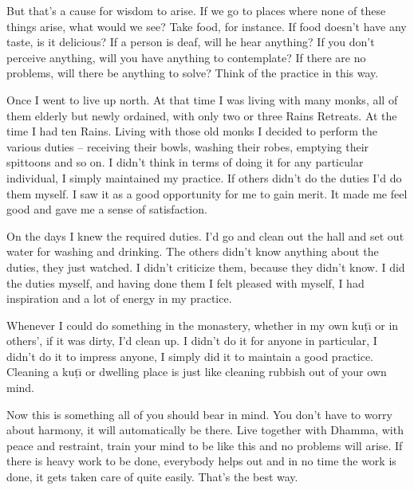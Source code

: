 But that's a cause for wisdom to arise. If we go to places where none of these things arise, what would we see? Take food, for instance. If food doesn't have any taste, is it delicious? If a person is deaf, will he hear anything? If you don't perceive anything, will you have anything to contemplate? If there are no problems, will there be anything to solve? Think of the practice in this way.

Once I went to live up north. At that time I was living with many monks, all of them elderly but newly ordained, with only two or three Rains Retreats. At the time I had ten Rains. Living with those old monks I decided to perform the various duties -- receiving their bowls, washing their robes, emptying their spittoons and so on. I didn't think in terms of doing it for any particular individual, I simply maintained my practice. If others didn't do the duties I'd do them myself. I saw it as a good opportunity for me to gain merit. It made me feel good and gave me a sense of satisfaction.

On the  days I knew the required duties. I'd go and clean out the  hall and set out water for washing and drinking. The others didn't know anything about the duties, they just watched. I didn't criticize them, because they didn't know. I did the duties myself, and having done them I felt pleased with myself, I had inspiration and a lot of energy in my practice.

Whenever I could do something in the monastery, whether in my own ku\d{t}\={\i} or in others', if it was dirty, I'd clean up. I didn't do it for anyone in particular, I didn't do it to impress anyone, I simply did it to maintain a good practice. Cleaning a ku\d{t}\={\i} or dwelling place is just like cleaning rubbish out of your own mind.

Now this is something all of you should bear in mind. You don't have to worry about harmony, it will automatically be there. Live together with Dhamma, with peace and restraint, train your mind to be like this and no problems will arise. If there is heavy work to be done, everybody helps out and in no time the work is done, it gets taken care of quite easily. That's the best way.

